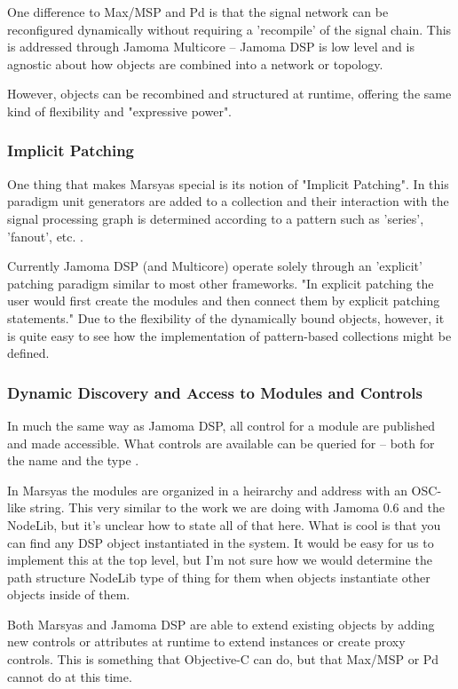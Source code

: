 \documentclass[twoside,10pt]{article}
\begin{document}
One difference to Max/MSP and Pd is that the signal network can be reconfigured dynamically without requiring a 'recompile' of the signal chain.  This is addressed through Jamoma Multicore -- Jamoma DSP is low level and is agnostic about how objects are combined into a network or topology.

However, objects can be recombined and structured at runtime, offering the same kind of flexibility and "expressive power".

\subsubsection{Implicit Patching}

One thing that makes Marsyas special is its notion of "Implicit Patching".  In this paradigm unit generators are added to a collection and their interaction with the signal processing graph is determined according to a pattern such as 'series', 'fanout', etc. \cite{Bray:2005}.

Currently Jamoma DSP (and Multicore) operate solely through an 'explicit' patching paradigm similar to most other frameworks.  "In explicit patching the user would first create the modules and then connect them by explicit patching statements."  Due to the flexibility of the dynamically bound objects, however, it is quite easy to see how the implementation of pattern-based collections might be defined.


\subsubsection{Dynamic Discovery and Access to Modules and Controls}

In much the same way as Jamoma DSP, all control for a module are published and made accessible.  What controls are available can be queried for -- both for the name and the type  \cite{Tzanetakis:2006}.  

In Marsyas the modules are organized in a heirarchy and address with an OSC-like string.  This very similar to the work we are doing with Jamoma 0.6 and the NodeLib, but it's unclear how to state all of that here.  What is cool is that you can find any DSP object instantiated in the system.  It would be easy for us to implement this at the top level, but I'm not sure how we would determine the path structure NodeLib type of thing for them when objects instantiate other objects inside of them.

Both Marsyas and Jamoma DSP are able to extend existing objects by adding new controls or attributes at runtime to extend instances or create proxy controls.  This is something that Objective-C can do, but that Max/MSP or Pd cannot do at this time.
\end{document}
